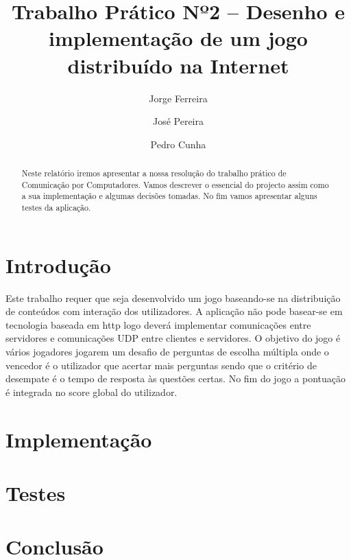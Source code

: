 \documentclass{llncs}
\begin{document}
\title{Trabalho Prático Nº2 – Desenho e implementação de um jogo distribuído na Internet}
\author{Jorge Ferreira \and José Pereira \and  Pedro Cunha}
\maketitle

\begin{abstract}
Neste relatório iremos apresentar a nossa resolução do trabalho prático de Comunicação por Computadores.
Vamos descrever o essencial do projecto assim como a sua implementação e algumas decisões tomadas. No fim vamos apresentar alguns testes da aplicação.
\end{abstract}

\section{Introdução}
Este trabalho requer que seja desenvolvido um jogo baseando-se na distribuição de conteúdos com interação dos utilizadores. A aplicação não pode basear-se em tecnologia baseada em http logo deverá implementar comunicações entre servidores e comunicações UDP entre clientes e servidores. O objetivo do jogo é vários jogadores jogarem um desafio de perguntas de escolha múltipla onde o vencedor é o utilizador que acertar mais perguntas sendo que o critério de desempate é o tempo de resposta às questões certas. No fim do jogo a pontuação é integrada no score global do utilizador.

\section{Implementação}
\section{Testes}
\section{Conclusão}
\end{document}
